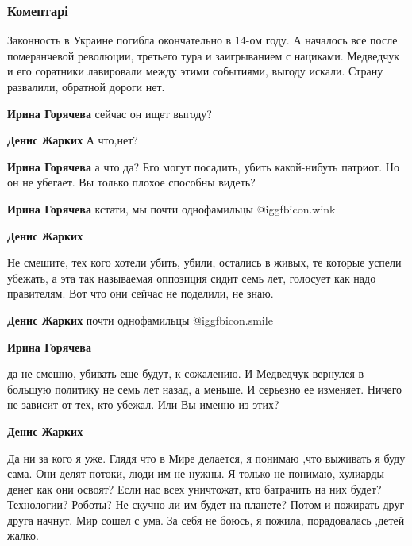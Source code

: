  
 
 
 
 
\subsubsection{Коментарі}
\label{sec:30_05_2021.fb.zharkih_denis.1.kto_my.cmt}

\begin{itemize} %

Законность в Украине погибла окончательно в 14-ом году. А началось все после
померанчевой революции, третьего тура и заигрыванием с нациками. Медведчук и его
соратники лавировали между этими событиями, выгоду искали. Страну
развалили, обратной дороги нет.

\begin{itemize} %
\textbf{Ирина Горячева} сейчас он ищет выгоду?

\textbf{Денис Жарких} А что,нет?

\textbf{Ирина Горячева} а что да? Его могут посадить, убить какой-нибуть патриот. Но он не убегает. Вы только плохое способны видеть?

\textbf{Ирина Горячева} кстати, мы почти однофамильцы  @igg{fbicon.wink} 

\textbf{Денис Жарких} 

Не смешите, тех кого хотели убить, убили, остались в живых, те которые успели
убежать, а эта так называемая оппозиция сидит семь лет, голосует как надо
правителям. Вот что они сейчас не поделили, не знаю.

\textbf{Денис Жарких} почти однофамильцы  @igg{fbicon.smile} 

\textbf{Ирина Горячева} 

да не смешно, убивать еще будут, к сожалению. И Медведчук вернулся в большую
политику не семь лет назад, а меньше. И серьезно ее изменяет. Ничего не зависит
от тех, кто убежал. Или Вы именно из этих?

\textbf{Денис Жарких} 

Да ни за кого я уже. Глядя что в Мире делается, я понимаю ,что выживать я буду
сама. Они делят потоки, люди им не нужны. Я только не понимаю, хулиарды денег как
они освоят? Если нас всех уничтожат, кто батрачить на них будет? Технологии?
Роботы? Не скучно ли им будет на планете? Потом и пожирать друг друга начнут.
Мир сошел с ума. За себя не боюсь, я пожила, порадовалась ,детей жалко.


\end{itemize}
\end{itemize}
